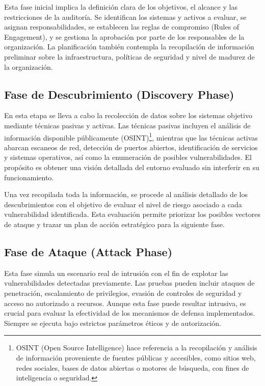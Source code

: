 \documentclass[a4paper, 11pt]{article}
\begin{document}
Esta fase inicial implica la definición clara de los objetivos, el alcance y las restricciones de la auditoría. Se identifican los sistemas y activos a evaluar, se asignan responsabilidades, se establecen las reglas de compromiso (Rules of Engagement), y se gestiona la aprobación por parte de los responsables de la organización. La planificación también contempla la recopilación de información preliminar sobre la infraestructura, políticas de seguridad y nivel de madurez de la organización.


\subsection{Fase de Descubrimiento (Discovery Phase)}

En esta etapa se lleva a cabo la recolección de datos sobre los sistemas objetivo mediante técnicas pasivas y activas. Las técnicas pasivas incluyen el análisis de información disponible públicamente (OSINT)\footnote{OSINT (Open Source Intelligence) hace referencia a la recopilación y análisis de información proveniente de fuentes públicas y accesibles, como sitios web, redes sociales, bases de datos abiertas o motores de búsqueda, con fines de inteligencia o seguridad.}, mientras que las técnicas activas abarcan escaneos de red, detección de puertos abiertos, 
identificación de servicios y sistemas operativos, así como la enumeración de posibles vulnerabilidades. El propósito es obtener una visión detallada del entorno evaluado sin interferir en su funcionamiento.


Una vez recopilada toda la información, se procede al análisis detallado de los descubrimientos con el objetivo de evaluar el nivel de riesgo asociado a cada vulnerabilidad identificada. Esta evaluación permite priorizar los posibles vectores de ataque y trazar un plan de acción estratégico para la siguiente fase.

\subsection{Fase de Ataque (Attack Phase)}

Esta fase simula un escenario real de intrusión con el fin de explotar las vulnerabilidades detectadas previamente. Las pruebas pueden incluir ataques de penetración, escalamiento de privilegios, evasión de controles de seguridad y acceso no autorizado a recursos. Aunque esta fase puede resultar intrusiva, es crucial para evaluar la efectividad de los mecanismos de defensa implementados. Siempre se ejecuta bajo estrictos parámetros éticos y de autorización.
\end{document}
